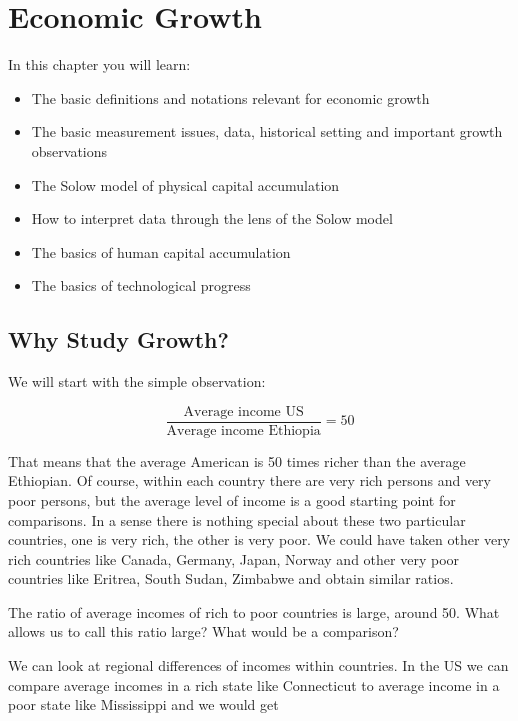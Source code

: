 \documentclass[
]{book}
\providecommand{\tightlist}{%
  \setlength{\itemsep}{0pt}\setlength{\parskip}{0pt}}
\begin{document}
\hypertarget{growth}{%
\chapter{Economic Growth}\label{growth}}

In this chapter you will learn:

\begin{itemize}
\tightlist
\item
  The basic definitions and notations relevant for economic growth
\item
  The basic measurement issues, data, historical setting and important growth observations
\item
  The Solow model of physical capital accumulation
\item
  How to interpret data through the lens of the Solow model
\item
  The basics of human capital accumulation
\item
  The basics of technological progress
\end{itemize}

\hypertarget{why-study-growth}{%
\section{Why Study Growth?}\label{why-study-growth}}

We will start with the simple observation:

\[\frac{\text{Average income US}}{\text{Average income Ethiopia}} = 50\]

That means that the average American is 50 times richer than the average Ethiopian. Of course, within each country there are very rich persons and very poor persons, but the average level of income is a good starting point for comparisons. In a sense there is nothing special about these two particular countries, one is very rich, the other is very poor. We could have taken other very rich countries like Canada, Germany, Japan, Norway and other very poor countries like Eritrea, South Sudan, Zimbabwe and obtain similar ratios.

The ratio of average incomes of rich to poor countries is large, around 50. What allows us to call this ratio large? What would be a comparison?

We can look at regional differences of incomes within countries. In the US we can compare average incomes in a rich state like Connecticut to average income in a poor state like Mississippi and we would get
\end{document}

